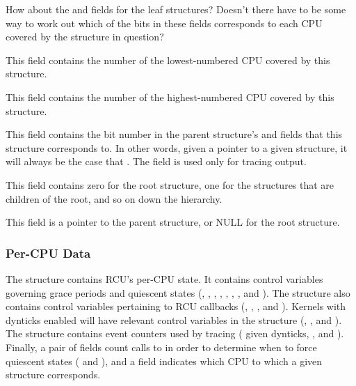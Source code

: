 \begin{description}
\QuickQuiz{}
	How about the  and 
	fields for the leaf  structures?
	Doesn't there have to be some way to work out
	which of the bits in these fields corresponds
	to each CPU covered by the  structure
	in question?
 \QuickQuizEnd

\item[\co{grplo}:]
	This field contains the number of the lowest-numbered CPU covered
	by this  structure.
\item[\co{grphi}:]
	This field contains the number of the highest-numbered CPU covered
	by this  structure.
\item[\co{grpnum}:]
	This field contains the bit number in the parent 
	structure's  and  fields that this
	 structure corresponds to.
	In other words, given a pointer  to a given
	 structure, it will always be the case that
	.
	The  field is used only for tracing output.
\item[\co{level}:]
	This field contains zero for the root  structure,
	one for the  structures that are children of
	the root, and so on down the hierarchy.
\item[\co{parent}:]
	This field is a pointer to the parent  structure,
	or NULL for the root  structure.
\end{description}

\subsubsection{Per-CPU Data}
\label{app:rcuimpl:rcutreewt:Per-CPU Data}

The  structure contains RCU's per-CPU state.
It contains control variables governing grace periods and
quiescent states (, , ,
, , , ,
and ).
The  structure also contains control variables pertaining
to RCU callbacks
(, , , and ).
Kernels with dynticks enabled will have relevant control variables in
the  structure
(, , and ).
The  structure contains event counters used by tracing
( given dynticks, , and ).
Finally, a pair of fields count calls to  in order
to determine when to force quiescent states ( and
), and a  field indicates which
CPU to which a given  structure corresponds.

